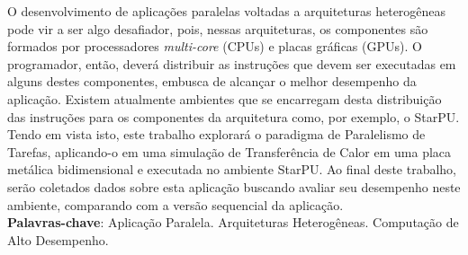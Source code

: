 
\begin{resumo}[RESUMO]
\begin{SingleSpacing}


O desenvolvimento de aplicações paralelas voltadas a arquiteturas heterogêneas pode vir a ser algo desafiador, pois, nessas arquiteturas, os componentes são formados por processadores \emph{multi-core} (CPUs) e placas gráficas (GPUs).
O programador, então, deverá distribuir as instruções que devem ser executadas em alguns destes componentes, embusca de alcançar o melhor desempenho da aplicação.
Existem atualmente ambientes que se encarregam desta distribuição das instruções para os componentes da arquitetura como, por exemplo, o StarPU. 
Tendo em vista isto, este trabalho explorará o paradigma de Paralelismo de Tarefas, aplicando-o em uma simulação de Transferência de Calor em uma placa metálica bidimensional e executada no ambiente StarPU.
Ao final deste trabalho, serão coletados dados sobre esta aplicação buscando avaliar seu desempenho neste ambiente, comparando com a versão sequencial da aplicação.\\

\textbf{Palavras-chave}: Aplicação Paralela. Arquiteturas Heterogêneas. Computação de Alto Desempenho.

\end{SingleSpacing}
\end{resumo}